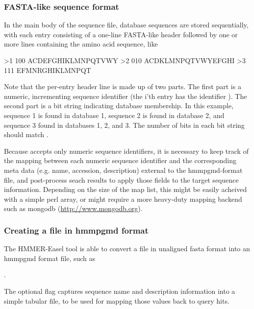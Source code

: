 \subsubsection{FASTA-like sequence format}

In the main body of the sequence file, database sequences are stored
sequentially, with each entry consisting of a one-line FASTA-like
header followed by one or more lines containing the amino acid sequence, 
like

\begin{cchunk}
>1 100
ACDEFGHIKLMNPQTVWY
>2 010
ACDKLMNPQTVWYEFGHI
>3 111
EFMNRGHIKLMNPQT
\end{cchunk}

Note that the per-entry header line is made up of two parts. The first part 
is a numeric, incrementing sequence identifier (the i'th entry has the
identifier ). The second part is a bit string indicating database
membership. In this example, sequence 1 is found in database 1, sequence 2 is
found in database 2, and sequence 3 found in databases 1, 2, and 3. The number 
of bits in each bit string should match .

Because  accepts only numeric sequence identifiers, it is
necessary to keep track of the mapping between each numeric sequence identifier
and the corresponding meta data (e.g. name, accession, description) external to
the hmmpgmd-format file, and post-process  seach results to 
apply those fields to the target sequence information.
Depending on the size of the map list, this might be easily acheived with a
simple perl array, or might require a more heavy-duty mapping backend such as
mongodb (\url{http://www.mongodb.org}).
  

\subsubsection{Creating a file in hmmpgmd format}

The HMMER-Easel tool  is able to convert a file in unaligned
fasta format into an hmmpgmd format file, such as

.

The optional  flag captures sequence name and description
information into a simple tabular file, to be used for mapping those values 
back to  query hits.



